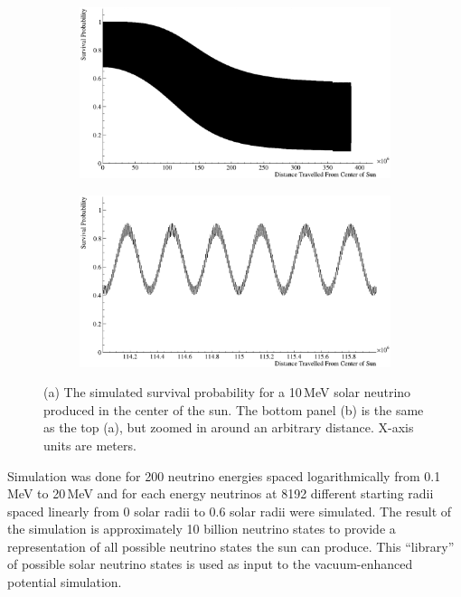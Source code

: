 \begin{figure}[htbp]
\centering
\begin{subfigure}[b]{0.88\textwidth}
\centering
\includegraphics[width=\textwidth]{SolarNeutrino_example.eps}
\caption{}
\end{subfigure}

\begin{subfigure}[b]{0.88\textwidth}
\centering
\includegraphics[width=\textwidth]{SolarNeutrino_zoomed_example.eps}
\caption{}
\end{subfigure}
\caption[Example Neutrino State Simulation]{(a) The simulated survival probability for a 10\,MeV solar neutrino produced
in the center of the sun. The bottom panel (b) is the same as the top (a), but zoomed
 in around an arbitrary distance. X-axis units are meters.}
\label{fig:sim_example}
\end{figure}

Simulation was done for 200 neutrino energies spaced logarithmically from
0.1\,MeV to 20\,MeV and for each energy neutrinos at 8192 different starting radii spaced linearly from 0
solar radii to 0.6 solar radii were simulated.
The result of the simulation is approximately 10 billion neutrino states
to provide a representation of all possible neutrino states the sun can produce.
This ``library'' of possible solar neutrino states
is used as input to the vacuum-enhanced potential simulation.


